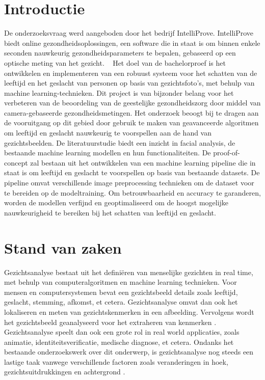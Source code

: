 
\section{Introductie}%
\label{sec:introductie}

De onderzoeksvraag werd aangeboden door het bedrijf IntelliProve. IntelliProve biedt online gezondheidsoplossingen, een software die in staat is om binnen enkele seconden nauwkeurig gezondheidsparameters te bepalen, gebaseerd op een optische meting van het gezicht.  
Het doel van de bachelorproef is het ontwikkelen en implementeren van een robuust systeem voor het schatten van de leeftijd en het geslacht van personen op basis van gezichtsfoto's, met behulp van machine learning-technieken. 
Dit project is van bijzonder belang voor het verbeteren van de beoordeling van de geestelijke gezondheidszorg door middel van camera-gebaseerde gezondheidsmetingen. Het onderzoek beoogt bij te dragen aan de vooruitgang op dit gebied door gebruik te maken van geavanceerde algoritmen om leeftijd en geslacht nauwkeurig te voorspellen aan de hand van gezichtsbeelden.
De literatuurstudie biedt een inzicht in facial analysis, de bestaande machine learning modellen en hun functionaliteiten. De proof-of-concept zal bestaan uit het ontwikkelen van een machine learning pipeline die in staat is om leeftijd en geslacht te voorspellen op basis van bestaande datasets. De pipeline omvat verschillende image preprocessing technieken om de dataset voor te bereiden op de modeltraining. Om betrouwbaarheid en accuracy te garanderen, worden de modellen verfijnd en geoptimaliseerd om de hoogst mogelijke nauwkeurigheid te bereiken bij het schatten van leeftijd en geslacht.

\section{Stand van zaken}
\label{sec:stand-van-zaken}

Gezichtsanalyse bestaat uit het definiëren van menselijke gezichten in real time, met behulp van computeralgoritmen en machine learning technieken. Voor mensen en computersystemen bevat een gezichtsbeeld details zoals leeftijd, geslacht, stemming, afkomst, et cetera.
Gezichtsanalyse omvat dan ook het lokaliseren en meten van gezichtskenmerken in een afbeelding. Vervolgens wordt het gezichtsbeeld geanalyseerd voor het extraheren van kenmerken \autocite{Sanil2023}. Gezichtsanalyse speelt dan ook een grote rol in real world applicaties, zoals animatie, identiteitsverificatie, medische diagnose, et cetera. Ondanks het bestaande onderzoekswerk over dit onderwerp, is gezichtsanalyse nog steeds een lastige taak vanwege verschillende factoren zoals veranderingen in hoek, gezichtsuitdrukkingen en achtergrond \autocite{Siddiqi2022}.


